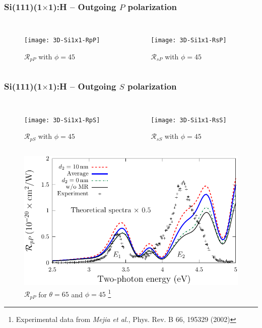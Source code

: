 \documentclass{beamer}
\begin{document}
\begin{frame}
\frametitle{Si(111)(1\texorpdfstring{$\times$}{x}1):H -- Outgoing
\texorpdfstring{$P$}{P} polarization}
\begin{columns}
\begin{figure}
\centering
\texttt{[image: 3D-Si1x1-RpP]}
\caption{$\mathcal{R}_{pP}$ with $\phi=45$}
\end{figure}
\begin{figure}
\centering
\texttt{[image: 3D-Si1x1-RsP]}
\caption{$\mathcal{R}_{sP}$ with $\phi=45$}
\end{figure}
\end{columns}
\end{frame}

\begin{frame}
\frametitle{Si(111)(1\texorpdfstring{$\times$}{x}1):H -- Outgoing
\texorpdfstring{$S$}{S} polarization}
\begin{columns}
\begin{figure}
\centering
\texttt{[image: 3D-Si1x1-RpS]}
\caption{$\mathcal{R}_{pS}$ with $\phi=45$}
\end{figure}
\begin{figure}
\centering
\texttt{[image: 3D-Si1x1-RsS]}
\caption{$\mathcal{R}_{sS}$ with $\phi=45$}
\end{figure}
\end{columns}
\end{frame}

\begin{frame}
\begin{figure}
\centering
\includegraphics[width=\textwidth]{fig-Si1x1-MRdepth}
\caption{$\mathcal{R}_{pP}$ for $\theta=65$ and $\phi=45$%
\footnote{Experimental data from \emph{Mejia et al.}, Phys. Rev. B 66, 195329 (2002)}}
\end{figure}
\end{frame}
\end{document}
